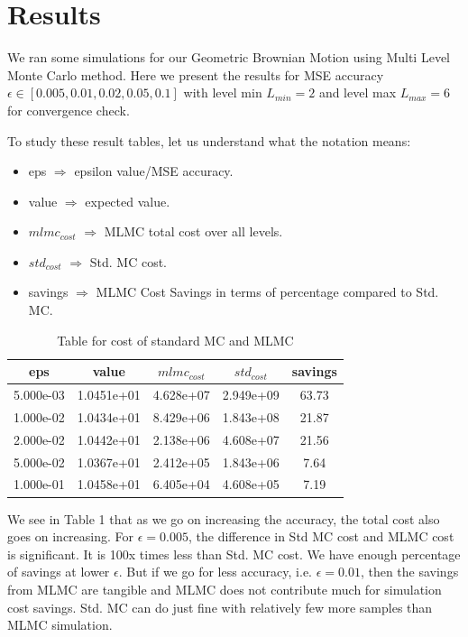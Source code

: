 \documentclass[12pt]{article}
\begin{document}
\section{Results}
We ran some simulations for our Geometric Brownian Motion using Multi Level Monte Carlo method. Here we present the results for MSE  accuracy $\epsilon \in [ 0.005, 0.01, 0.02, 0.05, 0.1 ]$ with level min $L_{min} = 2 $ and level max $ L_{max} = 6$ for convergence check. 
\par 
To study these result tables, let us understand what the notation means:
\begin{itemize}
\item eps $\Rightarrow$ epsilon value/MSE accuracy.
\item value $\Rightarrow$ expected value.
\item $mlmc_{cost}$ $\Rightarrow$ MLMC total cost over all levels.
\item $std_{cost}$ $\Rightarrow$ Std. MC cost.
\item savings $\Rightarrow$ MLMC Cost Savings in terms of percentage compared to Std. MC.
\end{itemize}

\clearpage 

\begin{table}[h!]
\begin{center}
\caption{Table for cost of standard MC and MLMC}
\begin{tabular}{||c c c c c||} 
 \hline
 eps & value & $mlmc_{cost}$ & $std_{cost}$ & savings\\ [0.5ex] 
 \hline\hline
 5.000e-03 & 1.0451e+01 & 4.628e+07 & 2.949e+09 & 63.73\\ 
 \hline
 1.000e-02 & 1.0434e+01 & 8.429e+06 & 1.843e+08  & 21.87\\
 \hline
 2.000e-02 & 1.0442e+01 & 2.138e+06 & 4.608e+07 & 21.56\\
 \hline
 5.000e-02 & 1.0367e+01 & 2.412e+05 & 1.843e+06  & 7.64\\
 \hline
 1.000e-01 & 1.0458e+01 & 6.405e+04 & 4.608e+05 & 7.19\\ [1ex] 
 \hline
\end{tabular}
\end{center}
\end{table}

We see in Table 1 that as we go on increasing the accuracy, the total cost also goes on increasing. For $\epsilon = 0.005$, the difference in Std MC cost and MLMC cost is significant. It is 100x times less than Std. MC cost. We have enough percentage of savings at lower $\epsilon$. But if we go for less accuracy, i.e. $\epsilon = 0.01$, then the savings from MLMC are tangible and MLMC does not contribute much for simulation cost savings. Std. MC can do just fine with relatively few more samples than MLMC simulation. 
\end{document}

